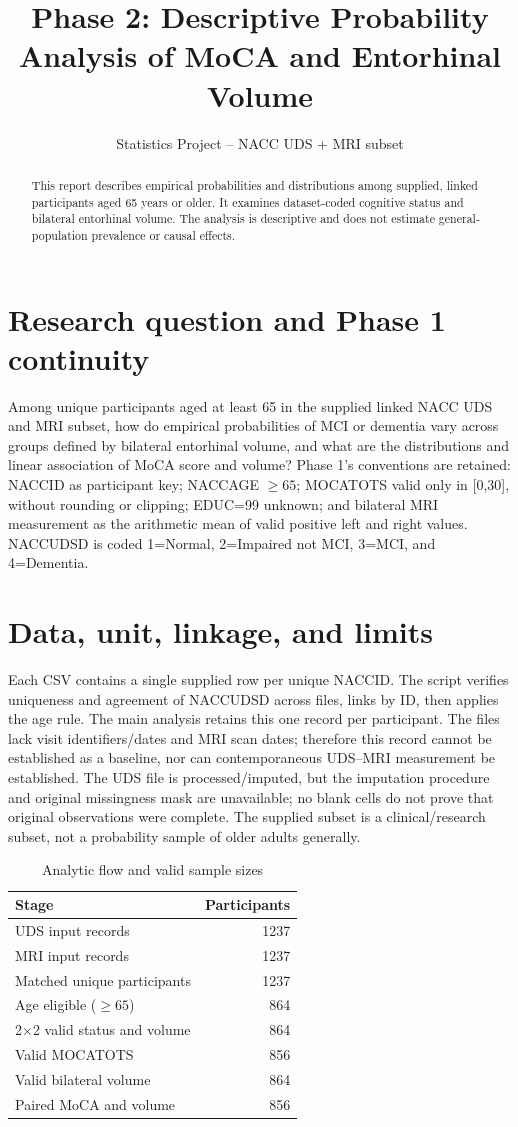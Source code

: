 \documentclass[11pt]{article}
\title{Phase 2: Descriptive Probability Analysis of MoCA and Entorhinal Volume}
\author{Statistics Project -- NACC UDS + MRI subset}
\date{}
\begin{document}
\maketitle
\begin{abstract}This report describes empirical probabilities and distributions among supplied, linked participants aged 65 years or older. It examines dataset-coded cognitive status and bilateral entorhinal volume. The analysis is descriptive and does not estimate general-population prevalence or causal effects.\end{abstract}
\section{Research question and Phase 1 continuity}
Among unique participants aged at least 65 in the supplied linked NACC UDS and MRI subset, how do empirical probabilities of MCI or dementia vary across groups defined by bilateral entorhinal volume, and what are the distributions and linear association of MoCA score and volume? Phase 1's conventions are retained: NACCID as participant key; NACCAGE $\geq65$; MOCATOTS valid only in [0,30], without rounding or clipping; EDUC=99 unknown; and bilateral MRI measurement as the arithmetic mean of valid positive left and right values. NACCUDSD is coded 1=Normal, 2=Impaired not MCI, 3=MCI, and 4=Dementia.
\section{Data, unit, linkage, and limits}
Each CSV contains a single supplied row per unique NACCID. The script verifies uniqueness and agreement of NACCUDSD across files, links by ID, then applies the age rule. The main analysis retains this one record per participant. The files lack visit identifiers/dates and MRI scan dates; therefore this record cannot be established as a baseline, nor can contemporaneous UDS--MRI measurement be established. The UDS file is processed/imputed, but the imputation procedure and original missingness mask are unavailable; no blank cells do not prove that original observations were complete. The supplied subset is a clinical/research subset, not a probability sample of older adults generally.
\begin{table}[H]\centering\caption{Analytic flow and valid sample sizes}\begin{tabular}{lr}\toprule Stage & Participants\\\midrule
UDS input records & 1237\\ MRI input records & 1237\\ Matched unique participants & 1237\\ Age eligible ($\geq65$) & 864\\ 2$\times$2 valid status and volume & 864\\ Valid MOCATOTS & 856\\ Valid bilateral volume & 864\\ Paired MoCA and volume & 856\\\bottomrule\end{tabular}\end{table}
\end{document}
